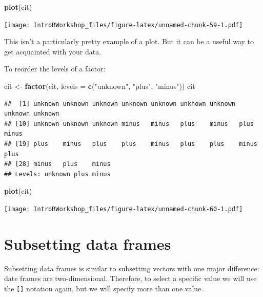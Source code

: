 \documentclass[
]{book}
\newenvironment{Shaded}{\begin{snugshade}}{\end{snugshade}}
\newcommand{\AttributeTok}[1]{\textcolor[rgb]{0.13,0.29,0.53}{#1}}
\newcommand{\FunctionTok}[1]{\textcolor[rgb]{0.13,0.29,0.53}{\textbf{#1}}}
\newcommand{\NormalTok}[1]{#1}
\newcommand{\OtherTok}[1]{\textcolor[rgb]{0.56,0.35,0.01}{#1}}
\newcommand{\StringTok}[1]{\textcolor[rgb]{0.31,0.60,0.02}{#1}}
\begin{document}
\begin{Shaded}
\begin{Highlighting}[]
\FunctionTok{plot}\NormalTok{(cit)}
\end{Highlighting}
\end{Shaded}

\texttt{[image: IntroRWorkshop\_files/figure-latex/unnamed-chunk-59-1.pdf]}

This isn't a particularly pretty example of a plot. But it can be a useful way to get acquainted with your data.

To reorder the levels of a factor:

\begin{Shaded}
\begin{Highlighting}[]
\NormalTok{cit }\OtherTok{\textless{}{-}} \FunctionTok{factor}\NormalTok{(cit, }\AttributeTok{levels =} \FunctionTok{c}\NormalTok{(}\StringTok{"unknown"}\NormalTok{, }\StringTok{"plus"}\NormalTok{, }\StringTok{"minus"}\NormalTok{))}
\NormalTok{cit}
\end{Highlighting}
\end{Shaded}

\begin{verbatim}
##  [1] unknown unknown unknown unknown unknown unknown unknown unknown unknown
## [10] unknown unknown unknown minus   minus   plus    minus   plus    minus  
## [19] plus    minus   plus    plus    minus   plus    plus    minus   plus   
## [28] minus   plus    minus  
## Levels: unknown plus minus
\end{verbatim}

\begin{Shaded}
\begin{Highlighting}[]
\FunctionTok{plot}\NormalTok{(cit)}
\end{Highlighting}
\end{Shaded}

\texttt{[image: IntroRWorkshop\_files/figure-latex/unnamed-chunk-60-1.pdf]}

\section{Subsetting data frames}\label{subsetting-data-frames}

Subsetting data frames is similar to subsetting vectors with one major difference: date frames are two-dimensional. Therefore, to select a specific value we will use the \texttt{{[}{]}} notation again, but we will specify more than one value.
\end{document}
